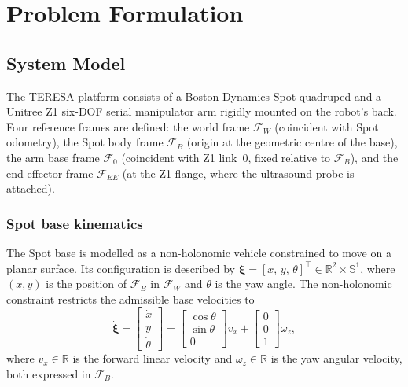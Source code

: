 \section{Problem Formulation}
\label{sec:problem_formulation}

\subsection{System Model}

The \ac{TERESA} platform consists of a Boston Dynamics Spot quadruped and a
Unitree Z1 six-\ac{DOF} serial manipulator arm rigidly mounted on the
robot's back. Four reference frames are defined: the world frame
$\mathcal{F}_W$ (coincident with Spot odometry), the Spot body frame
$\mathcal{F}_B$ (origin at the geometric centre of the base), the arm base
frame $\mathcal{F}_0$ (coincident with Z1 link~0, fixed relative to
$\mathcal{F}_B$), and the end-effector frame $\mathcal{F}_{EE}$ (at the Z1
flange, where the ultrasound probe is attached).

\subsubsection{Spot base kinematics}
The Spot base is modelled as a non-holonomic vehicle constrained to move on a
planar surface. Its configuration is described by
$\boldsymbol{\xi} = [x,\, y,\, \theta]^\top \in \mathbb{R}^2 \times
\mathbb{S}^1$, where $(x, y)$ is the position of $\mathcal{F}_B$ in
$\mathcal{F}_W$ and $\theta$ is the yaw angle. The non-holonomic constraint
restricts the admissible base velocities to
\begin{equation}
  \dot{\boldsymbol{\xi}} =
  \begin{bmatrix} \dot{x} \\ \dot{y} \\ \dot{\theta} \end{bmatrix}
  =
  \begin{bmatrix} \cos\theta \\ \sin\theta \\ 0 \end{bmatrix} v_x
  +
  \begin{bmatrix} 0 \\ 0 \\ 1 \end{bmatrix} \omega_z,
  \label{eq:nonholonomic}
\end{equation}
where $v_x \in \mathbb{R}$ is the forward linear velocity and
$\omega_z \in \mathbb{R}$ is the yaw angular velocity, both expressed in
$\mathcal{F}_B$.

